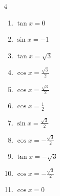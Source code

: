 \begin{multicols}{4}
\begin{enumerate}

  \item $\displaystyle \tan{x}  = 0$

        \phantom{$\displaystyle x = 0 , \pi$}

  \item $\displaystyle \sin{x}  = -1$


  \item $\displaystyle \tan{x}  = \sqrt{3}$


\columnbreak %

\resetques

  \item $\displaystyle \cos{x}  = \frac{\sqrt{3}}{2}$


  \item $\displaystyle \cos{x}  = \frac{\sqrt{3}}{2}$


  \item $\displaystyle \cos{x}  = \frac{1}{2}$


  \item $\displaystyle \sin{x}  = \frac{\sqrt{3}}{2}$


  \item $\displaystyle \cos{x}  = -\frac{\sqrt{3}}{2}$


  \item $\displaystyle \tan{x}  = -\sqrt{3}$


  \item $\displaystyle \cos{x}  = -\frac{\sqrt{3}}{2}$


  \item $\displaystyle \cos{x}  = 0$


\end{enumerate}
\end{multicols}
